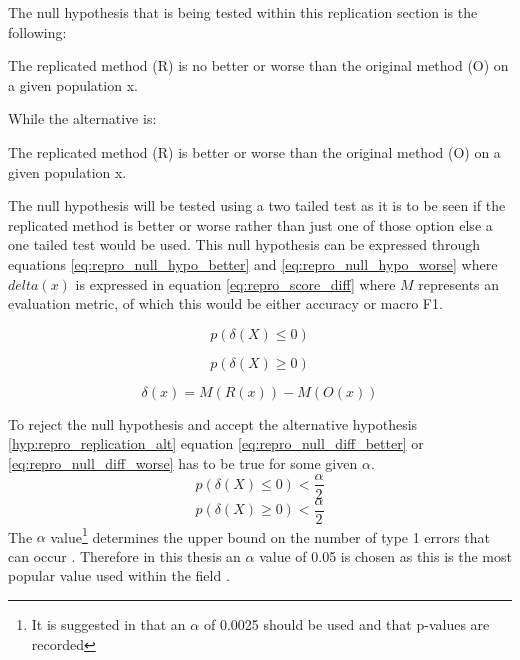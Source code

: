 The null hypothesis that is being tested within this replication section is the following: 
\begin{hyp}
The replicated method (R) is no better or worse than the original method (O) on a given population x. 
\label{hyp:repro_replication_null}
\end{hyp}
While the alternative is:
\begin{hyp}
The replicated method (R) is better or worse than the original method (O) on a given population x. 
\label{hyp:repro_replication_alt}
\end{hyp}
The null hypothesis will be tested using a two tailed test as it is to be seen if the replicated method is better or worse rather than just one of those option else a one tailed test would be used. This null hypothesis can be expressed through equations \ref{eq:repro_null_hypo_better} and \ref{eq:repro_null_hypo_worse} where $delta(x)$ is expressed in equation \ref{eq:repro_score_diff} where $M$ represents an evaluation metric, of which this would be either accuracy or macro F1.

\begin{equation}
    p(\delta(X) \leq 0)
\label{eq:repro_null_hypo_better}
\end{equation}

\begin{equation}
    p(\delta(X) \geq 0)
\label{eq:repro_null_hypo_worse}
\end{equation}

\begin{equation}
    \delta(x) = M(R(x)) - M(O(x))
\label{eq:repro_score_diff}
\end{equation}

To reject the null hypothesis and accept the alternative hypothesis \ref{hyp:repro_replication_alt} equation \ref{eq:repro_null_diff_better} or \ref{eq:repro_null_diff_worse} has to be true for some given $\alpha$.
\begin{equation}
    p(\delta(X) \leq 0) < \frac{\alpha}{2}
\label{eq:repro_null_diff_better}
\end{equation}
\begin{equation}
    p(\delta(X) \geq 0) < \frac{\alpha}{2}
\label{eq:repro_null_diff_worse}
\end{equation}
The $\alpha$ value\footnote{It is suggested in \citet{sogaard-etal-2014-whats} that an $\alpha$ of 0.0025 should be used and that p-values are recorded} determines the upper bound on the number of type 1 errors that can occur \citep{dror-etal-2018-hitchhikers}. Therefore in this thesis an $\alpha$ value of 0.05 is chosen as this is the most popular value used within the field \citep{liu-zhang-2017-attention,he-etal-2018-exploiting}.

